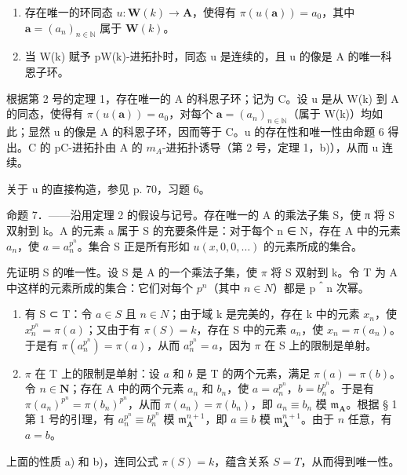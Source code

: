 \begin{enumerate}
\def\labelenumi{\alph{enumi})}
\item
  存在唯一的环同态 \(u: \mathbf{W}(k) \to \mathbf{A}\)，使得有 \(\pi(u(\boldsymbol{a})) = a_0\)，其中 \(\boldsymbol{a} = (a_n)_{n \in \mathbb{N}}\) 属于 \(\mathbf{W}(k)\)。
\item
  当 W(k) 赋予 pW(k)-进拓扑时，同态 u 是连续的，且 u 的像是 A 的唯一科恩子环。
\end{enumerate}

根据第 2 号的定理 1，存在唯一的 A 的科恩子环；记为 C。设 u 是从 W(k) 到 A 的同态，使得有 \(\pi(u(\boldsymbol{a})) = a_0\)，对每个 \(\boldsymbol{a} = (a_n)_{n \in \mathbb{N}}\)（属于 W(k)）均如此；显然 u 的像是 A 的科恩子环，因而等于 C。u 的存在性和唯一性由命题 6 得出。C 的 pC-进拓扑由 A 的 \(m_{A}\)-进拓扑诱导（第 2 号，定理 1，b)），从而 u 连续。

关于 u 的直接构造，参见 p. 70，习题 6。

命题 7．——沿用定理 2 的假设与记号。存在唯一的 A 的乘法子集 S，使 π 将 S 双射到 k。A 的元素 a 属于 S 的充要条件是：对于每个 n ∈ N，存在 A 中的元素 \(a_{n}\)，使 \(a = a_{n}^{p^{n}}\)。集合 S 正是所有形如 \(u(x, 0, 0, \ldots)\) 的元素所成的集合。

先证明 S 的唯一性。设 S 是 A 的一个乘法子集，使 \(\pi\) 将 S 双射到 k。令 T 为 A 中这样的元素所成的集合：它们对每个 \(p^{n}\)（其中 \(n \in N\)）都是 p＾n 次幂。

\begin{enumerate}
\def\labelenumi{\alph{enumi})}
\item
  有 S ⊂ T：令 \(a \in S\) 且 \(n \in N\)；由于域 k 是完美的，存在 k 中的元素 \(x_{n}\)，使 \(x_{n}^{p^{n}} = \pi(a)\)；又由于有 \(\pi(S) = k\)，存在 S 中的元素 \(a_{n}\)，使 \(x_{n} = \pi(a_{n})\)。于是有 \(\pi(a_{n}^{p^{n}}) = \pi(a)\)，从而 \(a_{n}^{p^{n}} = a\)，因为 \(\pi\) 在 S 上的限制是单射。
\item
  \(\pi\) 在 T 上的限制是单射：设 \(a\) 和 \(b\) 是 T 的两个元素，满足 \(\pi(a) = \pi(b)\)。令 \(n \in \mathbf{N}\)；存在 A 中的两个元素 \(a_n\) 和 \(b_n\)，使 \(a = a_n^{p^n}\)，\(b = b_n^{p^n}\)。于是有 \(\pi(a_n)^{p^n} = \pi(b_n)^{p^n}\)，从而 \(\pi(a_n) = \pi(b_n)\)，即 \(a_n \equiv b_n\) 模 \(\mathfrak{m}_{\mathbf{A}}\)。根据 § 1 第 1 号的引理，有 \(a_n^{p^n} \equiv b_n^{p^n}\) 模 \(\mathfrak{m}_{\mathbf{A}}^{n+1}\)，即 \(a \equiv b\) 模 \(\mathfrak{m}_{\mathbf{A}}^{n+1}\)。由于 \(n\) 任意，有 \(a = b\)。
\end{enumerate}

上面的性质 a) 和 b)，连同公式 \(\pi(S) = k\)，蕴含关系 \(S = T\)，从而得到唯一性。

